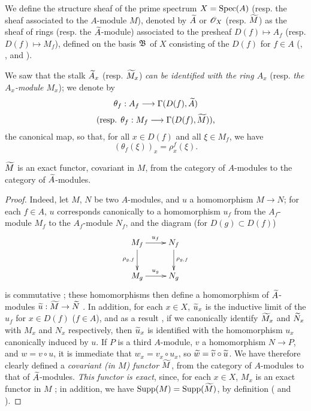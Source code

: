 \begin{defn}[1.3.4]
\label{1.1.3.4}
We define the structure sheaf of the prime spectrum $X={\mathop{\mathrm{Spec}}\nolimits}(A)$ (resp. the sheaf associated to the $A$-module $M$), denoted by ${\widetilde{A}}$ or $\mathscr{O}_X$ (resp. ${\widetilde{M}}$) as the sheaf of rings (resp. the ${\widetilde{A}}$-module) associated to the presheaf $D(f)\mapsto A_f$ (resp. $D(f)\mapsto M_f$), defined on the basis $\mathfrak{B}$ of $X$ consisting of the $D(f)$ for $f\in A$ (, , and ).
\end{defn}

We saw  that the stalk ${\widetilde{A}}_x$ (resp. ${\widetilde{M}}_x$) \emph{can be identified with the ring $A_x$} (resp. \emph{the $A_x$-module $M_x$});
we denote by
\[
  \theta_f:A_f\to\Gamma(D(f),\wt{A})
\]
\[
  \text{(resp. }\theta_f:M_f\to\Gamma(D(f),\wt{M})\text{),}
\]
the canonical map, so that, for all $x\in D(f)$ and all $\xi\in M_f$, we have
\[
  (\theta_f(\xi))_x=\rho_x^f(\xi).
  \tag{1.3.4.1}
\]

\begin{prop}[1.3.5]
\label{1.1.3.5}
${\widetilde{M}}$ is an exact functor, covariant in $M$, from the category of $A$-modules to the category of ${\widetilde{A}}$-modules.
\end{prop}

\begin{proof}
\label{proof-1.1.3.5}
Indeed, let $M$, $N$ be two $A$-modules, and $u$ a homomorphism $M\to N$;
for each $f\in A$, $u$ corresponds canonically to a homomorphism $u_f$ from the $A_f$-module $M_f$ to the $A_f$-module $N_f$, and the diagram (for $D(g)\subset D(f)$)
\[
  \xymatrix{
    M_f\ar[r]^{u_f}\ar[d]_{\rho_{g,f}} & N_f\ar[d]^{\rho_{g,f}}\\
    M_g\ar[r]^{u_g} & N_g
  }
\]
is commutative ;
these homomorphisms then define a homomorphism of ${\widetilde{A}}$-modules $\wt{u}:\wt{M}\to\wt{N}$ .
In addition, for each $x\in X$, ${\widetilde{u}}_x$ is the inductive limit of the $u_f$ for $x\in D(f)$ ($f\in A$), and as a result , if we canonically identify ${\widetilde{M}}_x$ and ${\widetilde{N}}_x$ with $M_x$ and $N_x$ respectively, then ${\widetilde{u}}_x$ is identified with the homomorphism $u_x$ canonically induced by $u$.
If $P$ is a third $A$-module, $v$ a homomorphism $N\to P$, and $w=v\circ u$, it is immediate that $w_x=v_x\circ u_x$, so ${\widetilde{w}}={\widetilde{v}}\circ{\widetilde{u}}$.
We have therefore clearly defined a \emph{covariant (in $M$) functor} ${\widetilde{M}}$, from the category of $A$-modules to that of ${\widetilde{A}}$-modules.
\emph{This functor is exact}, since, for each $x\in X$, $M_x$ is an exact functor in $M$ ;
in addition, we have ${\mathop{\mathrm{Supp}}\nolimits}(M)={\mathop{\mathrm{Supp}}\nolimits}({\widetilde{M}})$, by definition ( and ).
\end{proof}

